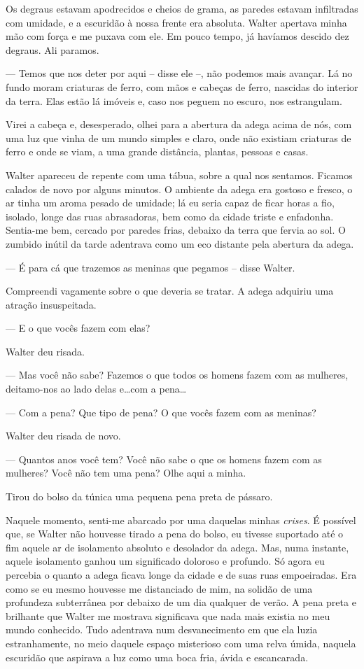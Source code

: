 Os degraus estavam apodrecidos e cheios de grama, as paredes estavam infiltradas com umidade, e a escuridão à nossa frente era absoluta. Walter apertava minha mão com força e me puxava com ele. Em pouco tempo, já havíamos descido dez degraus. Ali paramos.

--- Temos que nos deter por aqui -- disse ele --, não podemos mais avançar. Lá no fundo moram criaturas de ferro, com mãos e cabeças de ferro, nascidas do interior da terra. Elas estão lá imóveis e, caso nos peguem no escuro, nos estrangulam.

Virei a cabeça e, desesperado, olhei para a abertura da adega acima de nós, com uma luz que vinha de um mundo simples e claro, onde não existiam criaturas de ferro e onde se viam, a uma grande distância, plantas, pessoas e casas.

Walter apareceu de repente com uma tábua, sobre a qual nos sentamos. Ficamos calados de novo por alguns minutos. O ambiente da adega era gostoso e fresco, o ar tinha um aroma pesado de umidade; lá eu seria capaz de ficar horas a fio, isolado, longe das ruas abrasadoras, bem como da cidade triste e enfadonha. Sentia-me bem, cercado por paredes frias, debaixo da terra que fervia ao sol. O zumbido inútil da tarde adentrava como um eco distante pela abertura da adega.

--- É para cá que trazemos as meninas que pegamos -- disse Walter.

Compreendi vagamente sobre o que deveria se tratar. A adega adquiriu uma atração insuspeitada.

--- E o que vocês fazem com elas?

Walter deu risada.

--- Mas você não sabe? Fazemos o que todos os homens fazem com as mulheres, deitamo-nos ao lado delas e\dots com a pena\dots

--- Com a pena? Que tipo de pena? O que vocês fazem com as meninas?

Walter deu risada de novo.

--- Quantos anos você tem? Você não sabe o que os homens fazem com as mulheres? Você não tem uma pena? Olhe aqui a minha.

Tirou do bolso da túnica uma pequena pena preta de pássaro.

Naquele momento, senti-me abarcado por uma daquelas minhas \textit{crises}. É possível que, se Walter não houvesse tirado a pena do bolso, eu tivesse suportado até o fim aquele ar de isolamento absoluto e desolador da adega. Mas, numa instante, aquele isolamento ganhou um significado doloroso e profundo. Só agora eu percebia o quanto a adega ficava longe da cidade e de suas ruas empoeiradas. Era como se eu mesmo houvesse me distanciado de mim, na solidão de uma profundeza subterrânea por debaixo de um dia qualquer de verão. A pena preta e brilhante que Walter me mostrava significava que nada mais existia no meu mundo conhecido. Tudo adentrava num desvanecimento em que ela luzia estranhamente, no meio daquele espaço misterioso com uma relva úmida, naquela escuridão que aspirava a luz como uma boca fria, ávida e escancarada.

